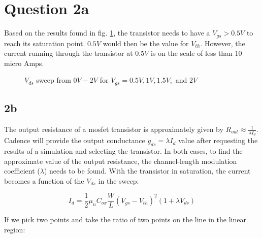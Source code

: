 \documentclass[12pt, letterpaper, notitlepage, DIV=16, BCOR=1mm, headlines=2]{scrreprt}
\begin{document}
\pagebreak
\section*{Question 2a}

Based on the results found in fig. \ref{fig:q2a},
the transistor needs to have a $V_{gs} > 0.5V$ to reach its saturation point. $0.5V$ would 
then be the value for $V_{th}$. However, the current running through the transistor at $0.5V$ is on
the scale of less than 10 micro Amps.

\begin{figure}[ht]
	\caption{$V_{ds}$ sweep from $0V-2V$ for $V_{gs}= 0.5V, 1V, 1.5V,$ and $2V$}
	\label{fig:q2a}
\end{figure}

\subsection*{2b}

The output resistance of a mosfet transistor is approximately given by 
$R_{out} \approx \frac{1}{\lambda I_d}$.
Cadence will provide the output conductance
$g_{ds} = \lambda I_d$ 
value after requesting the results of a simulation and selecting the transistor.
In both cases, to find the approximate value of the output resistance, the channel-length
modulation coefficient ($\lambda $) needs to be found. With the transistor in saturation,
the current becomes a function of the $V_{ds}$ in the sweep:

$$
I_d = \frac{1}{2}\mu _n C_{ox}\frac{W}{L}(V_{gs}-V_{th})^2 (1+\lambda V_{ds})
$$

If we pick two points and take the ratio of two points on the line in the linear region:
\end{document}
